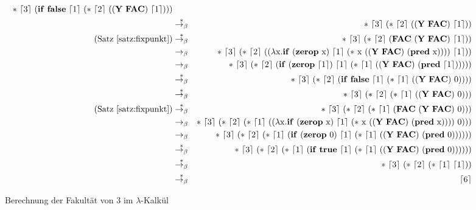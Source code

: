 \begin{figure}[!tb]
\begin{center}
\begin{eqnarray*}
    \ast~\lceil 3\rceil~(\mathbf{if}~\mathbf{false}~\lceil 1\rceil~(\ast~\lceil 2\rceil~((\mathbf{Y}~\mathbf{FAC})~\lceil 1\rceil)))\\
    &\overset{\ast}{\rightarrow_{\beta}}&
    \ast~\lceil 3\rceil~(\ast~\lceil 2\rceil~((\mathbf{Y}~\mathbf{FAC})~\lceil 1\rceil))\\
    \text{(Satz~\ref{satz:fixpunkt})} &\overset{\ast}{\rightarrow_{\beta}}&
    \ast~\lceil 3\rceil~(\ast~\lceil 2\rceil~(\mathbf{FAC}~(\mathbf{Y}~\mathbf{FAC})~\lceil 1\rceil))\\
    &\rightarrow_{\beta}&
    \ast~\lceil 3\rceil~(\ast~\lceil 2\rceil~((\lambda
    \lrm x.\mathbf{if}~(\mathbf{zerop}~\lrm x)~\lceil 1\rceil~(\ast~\lrm x~((\mathbf{Y}~\mathbf{FAC})~(\mathbf{pred}~\lrm x))))~\lceil 1\rceil))\\
%
%
    &\rightarrow_{\beta}&
    \ast~\lceil 3\rceil~(\ast~\lceil 2\rceil~(\mathbf{if}~(\mathbf{zerop}~\lceil 1\rceil)~\lceil 1\rceil~(\ast~\lceil 1\rceil~((\mathbf{Y}~\mathbf{FAC})~(\mathbf{pred}~\lceil 1\rceil)))))\\
    &\overset{\ast}{\rightarrow_{\beta}}&
    \ast~\lceil 3\rceil~(\ast~\lceil 2\rceil~(\mathbf{if}~\mathbf{false}~\lceil 1\rceil~(\ast~\lceil 1\rceil~((\mathbf{Y}~\mathbf{FAC})~0))))\\
    &\overset{\ast}{\rightarrow_{\beta}}&
    \ast~\lceil 3\rceil~(\ast~\lceil 2\rceil~(\ast~\lceil 1\rceil~((\mathbf{Y}~\mathbf{FAC})~0)))\\
    \text{(Satz~\ref{satz:fixpunkt})} &\overset{\ast}{\rightarrow_{\beta}}&
    \ast~\lceil 3\rceil~(\ast~\lceil 2\rceil~(\ast~\lceil 1\rceil~(\mathbf{FAC}~(\mathbf{Y}~\mathbf{FAC})~0)))\\
    &\rightarrow_{\beta}&
    \ast~\lceil 3\rceil~(\ast~\lceil 2\rceil~(\ast~\lceil 1\rceil~((\lambda
    \lrm x.\mathbf{if}~(\mathbf{zerop}~\lrm x)~\lceil 1\rceil~(\ast~\lrm x~((\mathbf{Y}~\mathbf{FAC})~(\mathbf{pred}~\lrm x))))~0)))\\
%
%
    &\rightarrow_{\beta}&
    \ast~\lceil 3\rceil~(\ast~\lceil 2\rceil~(\ast~\lceil 1\rceil~(\mathbf{if}~(\mathbf{zerop}~0)~\lceil 1\rceil~(\ast~\lceil 1\rceil~((\mathbf{Y}~\mathbf{FAC})~(\mathbf{pred}~0))))))\\
    &\overset{\ast}{\rightarrow_{\beta}}&
    \ast~\lceil 3\rceil~(\ast~\lceil 2\rceil~(\ast~\lceil 1\rceil~(\mathbf{if}~\mathbf{true}~\lceil 1\rceil~(\ast~\lceil 1\rceil~((\mathbf{Y}~\mathbf{FAC})~(\mathbf{pred}~0))))))\\
    &\overset{\ast}{\rightarrow_{\beta}}&
    \ast~\lceil 3\rceil~(\ast~\lceil 2\rceil~(\ast~\lceil 1\rceil~\lceil 1\rceil))\\
    &\overset{\ast}{\rightarrow_{\beta}}&
    \lceil 6\rceil
    \end{eqnarray*}
    \caption{Berechnung der Fakultät von 3 im $\lambda$-Kalkül}
    \label{fig:fac3}
  \end{center}
\end{figure}

